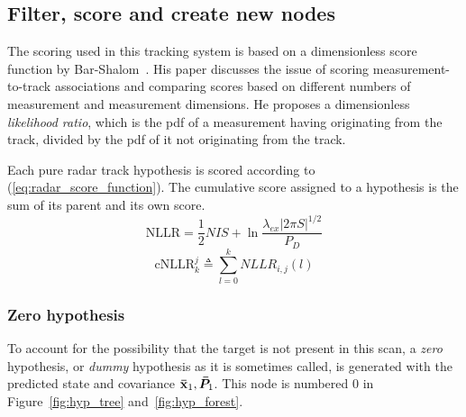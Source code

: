 \subsection{Filter, score and create new nodes}
The scoring used in this tracking system is based on a dimensionless score function by Bar-Shalom~\cite{Bar-Shalom2007}. His paper discusses the issue of scoring measurement-to-track associations and comparing scores based on different numbers of measurement and measurement dimensions. He proposes a dimensionless \emph{likelihood ratio}, which is the \gls{pdf} of a measurement having originating from the track, divided by the \gls{pdf} of it not originating from the track.

Each pure radar \gls{track hypothesis} is scored according to (\ref{eq:radar_score_function}).  The cumulative score assigned to a hypothesis is the sum of its parent and its own score.
\begin{equation}\label{eq:radar_score_function}
\mathrm{NLLR} = \frac{1}{2} NIS + \ln \frac{\lambda_{ex} |2 \pi S|^{1/2}} {P_D}		
\end{equation}
\begin{equation}
\mathrm{cNLLR}_k^j \triangleq \sum_{l=0}^k NLLR_{i,j}(l)
\end{equation}

\subsubsection{Zero hypothesis}\label{subsubsec:radar_zero_hypothesis}
To account for the possibility that the target is not present in this scan, a \emph{zero} hypothesis, or \emph{dummy} hypothesis as it is sometimes called, is generated with the predicted state and covariance \(\boldsymbol{\mathbf{\bar{x}}}_1, \bm{\bar{P}}_1\). This node is numbered 0 in Figure~\ref{fig:hyp_tree} and~\ref{fig:hyp_forest}.

